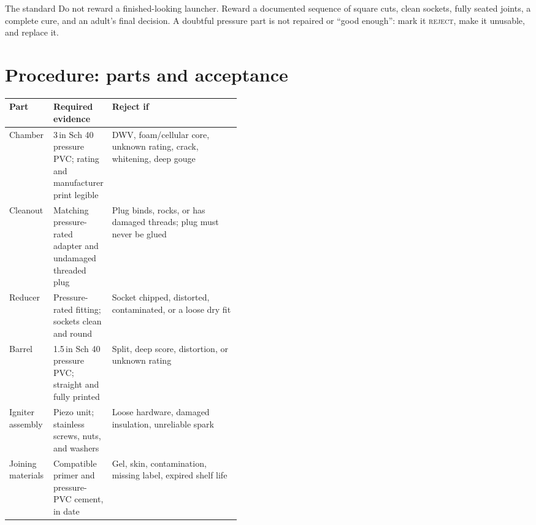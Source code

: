 


\launchernote

\begin{telospanel}{The standard}
Do not reward a finished-looking launcher. Reward a documented sequence of
square cuts, clean sockets, fully seated joints, a complete cure, and an
adult's final decision. A doubtful pressure part is not repaired or ``good
enough'': mark it \textsc{reject}, make it unusable, and replace it.
\end{telospanel}

\section{Procedure: parts and acceptance}
\begin{tabularx}{\linewidth}{@{}p{0.19\linewidth}p{0.25\linewidth}L@{}}
\toprule
\textbf{Part} & \textbf{Required evidence} & \textbf{Reject if}\\
\midrule
Chamber & 3\,in Sch 40 pressure PVC; rating and manufacturer print legible &
DWV, foam/cellular core, unknown rating, crack, whitening, deep gouge\\
Cleanout & Matching pressure-rated adapter and undamaged threaded plug &
Plug binds, rocks, or has damaged threads; plug must never be glued\\
Reducer & Pressure-rated fitting; sockets clean and round &
Socket chipped, distorted, contaminated, or a loose dry fit\\
Barrel & 1.5\,in Sch 40 pressure PVC; straight and fully printed &
Split, deep score, distortion, or unknown rating\\
Igniter assembly & Piezo unit; stainless screws, nuts, and washers &
Loose hardware, damaged insulation, unreliable spark\\
Joining materials & Compatible primer and pressure-PVC cement, in date &
Gel, skin, contamination, missing label, expired shelf life\\
\bottomrule
\end{tabularx}

\pvcnote

